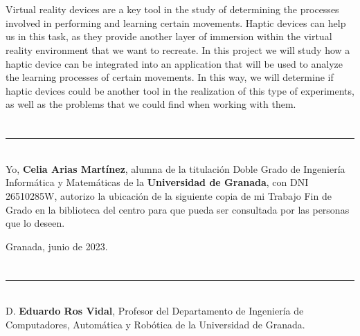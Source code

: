 \\

\vspace{0.7cm}
\\

Virtual reality devices are a key tool in the study of determining the processes involved in performing and learning certain movements. Haptic devices can help us in this task, as they provide another layer of immersion within the virtual reality environment that we want to recreate. In this project we will study how a haptic device can be integrated into an application that will be used to analyze  the learning processes of certain movements. In this way, we will determine if haptic devices could be another tool in the realization of this type of experiments, as well as the problems that we could find when working with them.

\chapter*{}
\thispagestyle{empty}

\noindent\rule[-1ex]{\textwidth}{2pt}\\[4.5ex]

Yo, \textbf{Celia Arias Martínez}, alumna de la titulación Doble Grado de Ingeniería Informática y Matemáticas de la \textbf{Universidad de Granada}, con DNI 26510285W, autorizo la
ubicación de la siguiente copia de mi Trabajo Fin de Grado en la biblioteca del centro para que pueda ser
consultada por las personas que lo deseen.



\begin{flushright}
Granada, junio de 2023.
\end{flushright}


\chapter*{}
\thispagestyle{empty}

\noindent\rule[-1ex]{\textwidth}{2pt}\\[4.5ex]

D. \textbf{Eduardo Ros Vidal}, Profesor del Departamento de Ingeniería de Computadores, Automática y Robótica de la Universidad de Granada.

\vspace{0.5cm}

